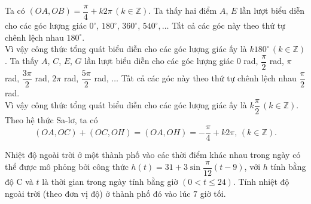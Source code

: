 \begin{ex}
{\begin{itemchoice}
\itemch Ta có $(OA,OB)=\dfrac{\pi}{4}+k2\pi \, (k\in \mathbb{Z})$.
\itemch Ta thấy hai điểm $A$, $E$ lần lượt biểu diễn cho các góc lượng giác $0 ^{\circ}$, $180 ^{\circ}$, $360 ^{\circ}$, $540 ^{\circ}, \ldots$ Tất cả các góc này theo thứ tự chênh lệch nhau $180 ^{\circ}$.\\
Vì vậy công thức tổng quát biểu diễn cho các góc lượng giác ấy là $k180 ^{\circ}\, (k\in \mathbb{Z})$.
\itemch 	Ta thấy $A$, $C $, $E$, $G$ lần lượt biểu diễn cho các góc lượng giác $0$ rad, $\dfrac{\pi}{2}$ rad, $\pi$ rad, $\dfrac{3\pi}{2}$ rad, $2\pi$ rad, $\dfrac{5\pi}{2}$ rad, $\ldots$ Tất cả các góc này theo thứ tự chênh lệch nhau $\dfrac{\pi}{2}$ rad.\\
Vì vậy công thức tổng quát biểu diễn cho các góc lượng giác ấy là $k\dfrac{\pi}{2}\,  (k\in \mathbb{Z})$.
\itemch Theo hệ thức Sa-lơ, ta có
\[(OA,OC)+(OC,OH)=(OA,OH)=-\dfrac{\pi}{4}+k2\pi, \, (k\in \mathbb{Z}).
\]
\end{itemchoice}
}
\end{ex}

\begin{bt}%
Nhiệt độ ngoài trời ở một thành phố vào các thời điểm khác nhau trong ngày có
thể được mô phỏng bởi công thức $h(t)=31+3\sin \dfrac{\pi}{12}(t-9)$, với $h$ tính bằng độ $\mathrm{C}$ và $t$ là thời gian trong ngày tính bằng giờ $(0<t\leq 24)$.
Tính nhiệt độ ngoài trời (theo đơn vị độ) ở thành phố đó vào lúc $7$ giờ tối. 
\end{bt}

